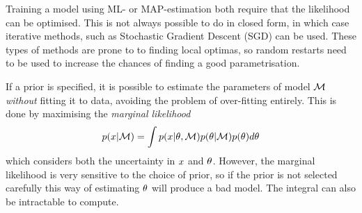 Training a model using ML- or MAP-estimation both require that the
likelihood can be optimised. This is not always possible to do in
closed form, in which case iterative methods, such as Stochastic
Gradient Descent (SGD) can be used. These types of methods are
prone to to finding local optimas, so random restarts need to be used
to increase the chances of finding a good parametrisation.

If a prior is specified, it is possible to estimate the parameters of
model $\mathcal{M}$ \textit{without} fitting it to data, avoiding the
problem of over-fitting entirely. This is done by maximising the
\textit{marginal likelihood}
\begin{equation}
  \label{eq:marginal-likelihod}
  p(x \vert \mathcal{M}) = \int p(x \vert \theta,
  \mathcal{M}) p(\theta \vert \mathcal{M}) p(\theta) d\theta
\end{equation}
which considers both the uncertainty in $x$ and
$\theta$. However, the marginal likelihood is very sensitive to
the choice of prior, so if the prior is not selected carefully this
way of estimating $\theta$ will produce a bad model. The integral
can also be intractable to compute.

